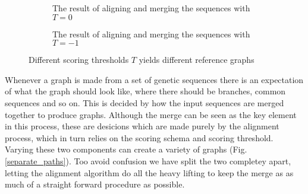 \documentclass[thesis.tex]{subfiles}
\begin{document}
\begin{wrapfigure}{r}{0.5\textwidth}
\begin{mdframed}
\begin{subfigure}[t]{\textwidth}
\begin{mdframed}
\begin{center}
        \end{center}
      \end{mdframed}
      \caption{The result of aligning and merging the sequences with $T=0$}
    \end{subfigure}
    \begin{subfigure}[t]{\textwidth}
      \begin{mdframed}
        \begin{center}
        \end{center}
      \end{mdframed}
      \caption{The result of aligning and merging the sequences with $T=-1$}
    \end{subfigure}
  \end{mdframed}
  \caption{Different scoring thresholds $T$ yields different reference graphs}
  \label{fig:separate_paths}
\end{wrapfigure}
Whenever a graph is made from a set of genetic sequences there is an expectation of what the graph should look like, where there should be branches, common sequences and so on. This is decided by how the input sequences are merged together to produce graphs. Although the merge can be seen as the key element in this process, these are desicions which are made purely by the alignment process, which in turn relies on the scoring schema and scoring threshold. Varying these two components can create a variety of graphs (Fig. \ref{separate_paths}). Too avoid confusion we have split the two completey apart, letting the alignment algorithm do all the heavy lifting to keep the merge as as much of a straight forward procedure as possible.\\
\end{document}
